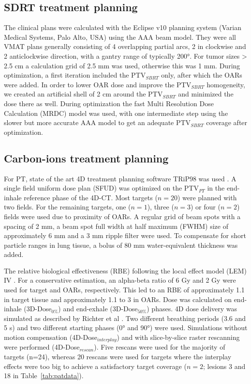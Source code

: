 \newpage

\subsection{SDRT treatment planning}
\label{SBRTTP}

The clinical plans were calculated with the Eclipse v10 planning system (Varian Medical Systems, Palo Alto, USA) using the AAA beam model. They were all VMAT plans generally consisting of 4 overlapping partial arcs, 2 in clockwise and 2 anticlockwise direction, with a gantry range of typically 200°. For tumor sizes > 2.5 cm a calculation grid of 2.5 mm was used, otherwise this was 1 mm. During optimization, a first iteration included the PTV$_{SBRT}$ only, after which the OARs were added. In order to lower OAR dose and improve the PTV$_{SBRT}$ homogeneity, we created an artificial shell of 2 cm around the PTV$_{SBRT}$ and minimized the dose there as well. During optimization the fast Multi Resolution Dose Calculation (MRDC) model was used, with one intermediate step using the slower but more accurate AAA model to get an adequate PTV$_{SBRT}$ coverage after optimization.


\subsection{Carbon-ions treatment planning}
\label{PTTP}

For PT, state of the art 4D treatment planning software TRiP98 was used \cite{Richter2013}. A single field uniform dose plan (SFUD) 
was optimized on the PTV$_{PT}$ in the end-inhale reference phase of the 4D-CT. Most targets ($n=20$) were planned with two fields. 
For the remaining targets, one ($n=1$), three ($n=3$) or four ($n=2$) fields were used due to proximity of OARs. 
A regular grid of beam spots with a spacing of 2 mm, a beam spot full width at half maximum (FWHM) size of approximately 6 mm and a 
3 mm ripple filter were used. To compensate for short particle ranges in lung tissue, a bolus of 80 mm water-equivalent thickness 
was added.

The relative biological effectiveness (RBE) following the local effect model (LEM) IV \cite{Elsaesser2010}. 
For a conservative estimation, an alpha-beta ratio of 6 Gy and 2 Gy were used for target and OARs, respectively. 
This led to an RBE of approximately 1.1 in target tissue and approximately 1.1 to 3 in OARs.
Dose was calculated on end-inhale (3D-Dose$_{0\%}$) and end-exhale (3D-Dose$_{50\%}$) phases. 
4D dose delivery was simulated as described by Richter et al \cite{Richter2014}. Two different breathing periods (3.6 and 5 s) 
and two different starting phases (0° and 90°) were used. Simulations without motion compensation (4D-Dose$_{interplay}$)
and with slice-by-slice raster rescanning were performed (4D-Dose$_{rescan}$). Five rescans were used for the majority 
of targets (n=24), whereas 20 rescans were used for targets where the interplay effects were too big to achieve a 
satisfactory target coverage ($n=2$; lesions 3 and 18 in Table~\ref{tab:patdata}). 


